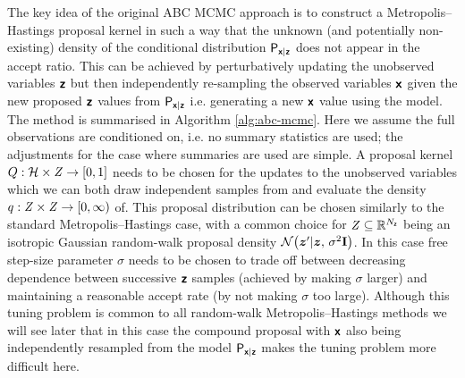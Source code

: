 The key idea of the original \ac{ABC} \ac{MCMC} \citep{marjoram2003markov} approach is to construct a Metropolis--Hastings proposal kernel in such a way that the unknown (and potentially non-existing) density of the conditional distribution $\mathsf{P}_{\boldsymbol{\mathsf{x}}|\boldsymbol{\mathsf{z}}}$ does not appear in the accept ratio. This can be achieved by perturbatively updating the unobserved variables $\boldsymbol{\mathsf{z}}$ but then independently re-sampling the observed variables $\boldsymbol{\mathsf{x}}$ given the new proposed $\boldsymbol{\mathsf{z}}$ values from $\mathsf{P}_{\boldsymbol{\mathsf{x}}|\boldsymbol{\mathsf{z}}}$ i.e. generating a new $\boldsymbol{\mathsf{x}}$ value using the model. The method is summarised in Algorithm \ref{alg:abc-mcmc}. Here we assume the full observations are conditioned on, i.e. no summary statistics are used; the adjustments for the case where summaries are used are simple. A proposal kernel $Q : \mathcal{H} \times \mathit{Z} \to [0,1]$ needs to be chosen for the updates to the unobserved variables which we can both draw independent samples from and evaluate the density $q : \mathit{Z} \times \mathit{Z} \to [0,\infty)$ of. This proposal distribution can be chosen similarly to the standard Metropolis--Hastings case, with a common choice for $\mathit{Z} \subseteq \mathbb{R}^{N_{\boldsymbol{\mathsf{z}}}}$ being an isotropic Gaussian random-walk proposal density $\nrm{\vct{z}'|\vct{z},\,\sigma^2 \mathbf{I}}$. In this case free step-size parameter $\sigma$ needs to be chosen to trade off between decreasing dependence between successive $\boldsymbol{\mathsf{z}}$ samples (achieved by making $\sigma$ larger) and maintaining a reasonable accept rate (by not making $\sigma$ too large). Although this tuning problem is common to all random-walk Metropolis--Hastings methods we will see later that in this case the compound proposal with $\boldsymbol{\mathsf{x}}$ also being independently resampled from the model $\mathsf{P}_{\boldsymbol{\mathsf{x}}|\boldsymbol{\mathsf{z}}}$ makes the tuning problem more difficult here.

